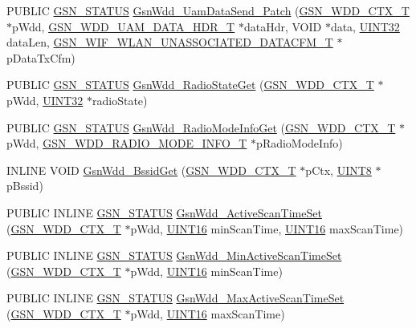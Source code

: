 \begin{DoxyCompactItemize}
\item 
PUBLIC \hyperlink{a00660_gada5951904ac6110b1fa95e51a9ddc217}{GSN\_\-STATUS} \hyperlink{a00603_a3dc16a6b58b56b3a825e6b2ac29ce95b}{GsnWdd\_\-UamDataSend\_\-Patch} (\hyperlink{a00108}{GSN\_\-WDD\_\-CTX\_\-T} $\ast$pWdd, \hyperlink{a00314}{GSN\_\-WDD\_\-UAM\_\-DATA\_\-HDR\_\-T} $\ast$dataHdr, VOID $\ast$data, \hyperlink{a00660_gae1e6edbbc26d6fbc71a90190d0266018}{UINT32} dataLen, \hyperlink{a00414}{GSN\_\-WIF\_\-WLAN\_\-UNASSOCIATED\_\-DATACFM\_\-T} $\ast$pDataTxCfm)
\item 
PUBLIC \hyperlink{a00660_gada5951904ac6110b1fa95e51a9ddc217}{GSN\_\-STATUS} \hyperlink{a00603_aabc4c7bb7e67428baf82fe3ca3491d09}{GsnWdd\_\-RadioStateGet} (\hyperlink{a00108}{GSN\_\-WDD\_\-CTX\_\-T} $\ast$pWdd, \hyperlink{a00660_gae1e6edbbc26d6fbc71a90190d0266018}{UINT32} $\ast$radioState)
\item 
PUBLIC \hyperlink{a00660_gada5951904ac6110b1fa95e51a9ddc217}{GSN\_\-STATUS} \hyperlink{a00603_ac1f78bd778b4df7b2e64497fc897fc30}{GsnWdd\_\-RadioModeInfoGet} (\hyperlink{a00108}{GSN\_\-WDD\_\-CTX\_\-T} $\ast$pWdd, \hyperlink{a00283}{GSN\_\-WDD\_\-RADIO\_\-MODE\_\-INFO\_\-T} $\ast$pRadioModeInfo)
\item 
INLINE VOID \hyperlink{a00603_a701a912d9abc9913d06c3537136f818f}{GsnWdd\_\-BssidGet} (\hyperlink{a00108}{GSN\_\-WDD\_\-CTX\_\-T} $\ast$pCtx, \hyperlink{a00660_gab27e9918b538ce9d8ca692479b375b6a}{UINT8} $\ast$pBssid)
\item 
PUBLIC INLINE \hyperlink{a00660_gada5951904ac6110b1fa95e51a9ddc217}{GSN\_\-STATUS} \hyperlink{a00603_ad5ea06cf67940cf920306ee76a3d1a40}{GsnWdd\_\-ActiveScanTimeSet} (\hyperlink{a00108}{GSN\_\-WDD\_\-CTX\_\-T} $\ast$pWdd, \hyperlink{a00660_ga09f1a1fb2293e33483cc8d44aefb1eb1}{UINT16} minScanTime, \hyperlink{a00660_ga09f1a1fb2293e33483cc8d44aefb1eb1}{UINT16} maxScanTime)
\item 
PUBLIC INLINE \hyperlink{a00660_gada5951904ac6110b1fa95e51a9ddc217}{GSN\_\-STATUS} \hyperlink{a00603_a9c591d80ae7c6a5771307f06cd0f0906}{GsnWdd\_\-MinActiveScanTimeSet} (\hyperlink{a00108}{GSN\_\-WDD\_\-CTX\_\-T} $\ast$pWdd, \hyperlink{a00660_ga09f1a1fb2293e33483cc8d44aefb1eb1}{UINT16} minScanTime)
\item 
PUBLIC INLINE \hyperlink{a00660_gada5951904ac6110b1fa95e51a9ddc217}{GSN\_\-STATUS} \hyperlink{a00603_a503f45e0e6d84258988e08111ac4d94c}{GsnWdd\_\-MaxActiveScanTimeSet} (\hyperlink{a00108}{GSN\_\-WDD\_\-CTX\_\-T} $\ast$pWdd, \hyperlink{a00660_ga09f1a1fb2293e33483cc8d44aefb1eb1}{UINT16} maxScanTime)
\item 

\end{DoxyCompactItemize}
